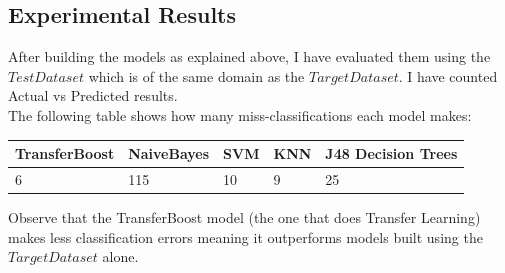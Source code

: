 \documentclass[a4paper,12pt, english]{article}
\begin{document}
\subsection{Experimental Results}
After building the models as explained above, I have evaluated them using the $Test Dataset$ which is of the same domain as the $Target Dataset$. I have counted Actual vs Predicted results.\\
The following table shows how many miss-classifications each model makes:\\ 
\begin{center}
    \begin{tabular}{ | l | l | l | p{5cm} | l |}
    \hline
    TransferBoost & NaiveBayes & SVM & KNN & J48 Decision Trees \\ \hline
    6 & 115 & 10 & 9 & 25\\
    \hline
    \end{tabular}       
\end{center}

Observe that the TransferBoost model (the one that does Transfer Learning) makes less classification errors meaning it outperforms models built using the $Target Dataset$ alone.
\end{document}
